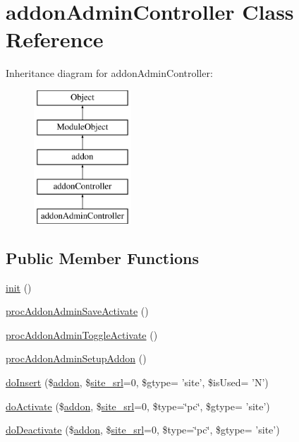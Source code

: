 \hypertarget{classaddonAdminController}{\section{addon\-Admin\-Controller Class Reference}
\label{classaddonAdminController}
}
Inheritance diagram for addon\-Admin\-Controller\-:\begin{figure}[H]
\begin{center}
\leavevmode
\includegraphics[height=5.000000cm]{classaddonAdminController}
\end{center}
\end{figure}
\subsection*{Public Member Functions}
\begin{DoxyCompactItemize}
\item 
\hyperlink{classaddonAdminController_a429384cd42bbb45d8a9f6be4073cc7b6}{init} ()
\item 
\hyperlink{classaddonAdminController_a59081b3459b0704e973fdbe2fc5d14d1}{proc\-Addon\-Admin\-Save\-Activate} ()
\item 
\hyperlink{classaddonAdminController_a97250cb7cb4dc0b78789b8a9186d94d4}{proc\-Addon\-Admin\-Toggle\-Activate} ()
\item 
\hyperlink{classaddonAdminController_a43db10c21a41c0ebbeb13257d9bf86ea}{proc\-Addon\-Admin\-Setup\-Addon} ()
\item 
\hyperlink{classaddonAdminController_a26ac8a98f91ad7a48d9307b7a87932c7}{do\-Insert} (\$\hyperlink{classaddon}{addon}, \$\hyperlink{ko_8install_8php_a8b1406b4ad1048041558dce6bfe89004}{site\-\_\-srl}=0, \$gtype= 'site', \$is\-Used= 'N')
\item 
\hyperlink{classaddonAdminController_a226fc2d221e8f5272dabeb1ef86cb9f3}{do\-Activate} (\$\hyperlink{classaddon}{addon}, \$\hyperlink{ko_8install_8php_a8b1406b4ad1048041558dce6bfe89004}{site\-\_\-srl}=0, \$type=\char`\"{}pc\char`\"{}, \$gtype= 'site')
\item 
\hyperlink{classaddonAdminController_ae520cdfe4f5e3f2e7c24c34d5a8d316e}{do\-Deactivate} (\$\hyperlink{classaddon}{addon}, \$\hyperlink{ko_8install_8php_a8b1406b4ad1048041558dce6bfe89004}{site\-\_\-srl}=0, \$type=\char`\"{}pc\char`\"{}, \$gtype= 'site')
\end{DoxyCompactItemize}
